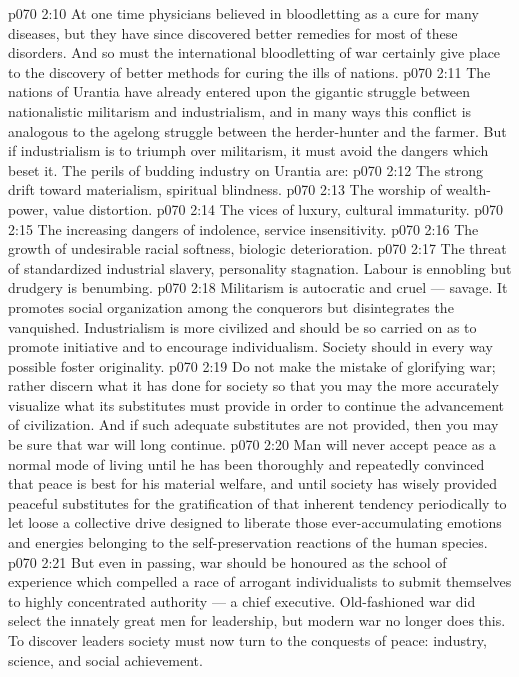 \vs p070 2:10 At one time physicians believed in bloodletting as a cure for many diseases, but they have since discovered better remedies for most of these disorders. And so must the international bloodletting of war certainly give place to the discovery of better methods for curing the ills of nations.
\vs p070 2:11 The nations of Urantia have already entered upon the gigantic struggle between nationalistic militarism and industrialism, and in many ways this conflict is analogous to the agelong struggle between the herder\hyp{}hunter and the farmer. But if industrialism is to triumph over militarism, it must avoid the dangers which beset it. The perils of budding industry on Urantia are:
\vs p070 2:12 \bibnobreakspace The strong drift toward materialism, spiritual blindness.
\vs p070 2:13 \bibnobreakspace The worship of wealth\hyp{}power, value distortion.
\vs p070 2:14 \bibnobreakspace The vices of luxury, cultural immaturity.
\vs p070 2:15 \bibnobreakspace The increasing dangers of indolence, service insensitivity.
\vs p070 2:16 \bibnobreakspace The growth of undesirable racial softness, biologic deterioration.
\vs p070 2:17 \bibnobreakspace The threat of standardized industrial slavery, personality stagnation. Labour is ennobling but drudgery is benumbing.
\vs p070 2:18 \pc Militarism is autocratic and cruel --- savage. It promotes social organization among the conquerors but disintegrates the vanquished. Industrialism is more civilized and should be so carried on as to promote initiative and to encourage individualism. Society should in every way possible foster originality.
\vs p070 2:19 Do not make the mistake of glorifying war; rather discern what it has done for society so that you may the more accurately visualize what its substitutes must provide in order to continue the advancement of civilization. And if such adequate substitutes are not provided, then you may be sure that war will long continue.
\vs p070 2:20 Man will never accept peace as a normal mode of living until he has been thoroughly and repeatedly convinced that peace is best for his material welfare, and until society has wisely provided peaceful substitutes for the gratification of that inherent tendency periodically to let loose a collective drive designed to liberate those ever\hyp{}accumulating emotions and energies belonging to the self\hyp{}preservation reactions of the human species.
\vs p070 2:21 But even in passing, war should be honoured as the school of experience which compelled a race of arrogant individualists to submit themselves to highly concentrated authority --- a chief executive. Old\hyp{}fashioned war did select the innately great men for leadership, but modern war no longer does this. To discover leaders society must now turn to the conquests of peace: industry, science, and social achievement.
